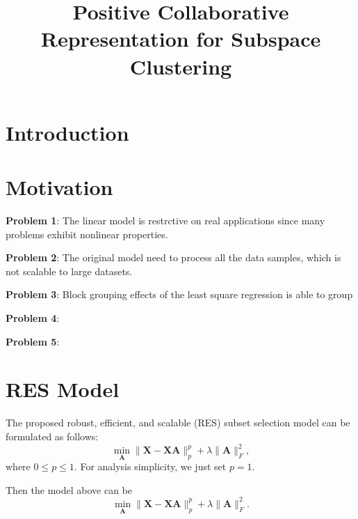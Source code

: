 \documentclass[10pt,twocolumn,letterpaper]{article}
\begin{document}
\title{Positive Collaborative Representation for Subspace Clustering}

\maketitle



\begin{abstract}

\end{abstract}

\section{Introduction}



\section{Motivation}


\textbf{Problem 1}: The linear model is restrctive on real applications since many problems exhibit nonlinear properties.

\textbf{Problem 2}: The original model need to process all the data samples, which is not scalable to large datasets.

\textbf{Problem 3}: Block grouping effects of the least square regression is able to group 

\textbf{Problem 4}: 

\textbf{Problem 5}:


\section{RES Model}
The proposed robust, efficient, and scalable (RES) subset selection model can be formulated as follows:
\begin{equation}
\label{e1}
\min_{\bm{A}}
\|
\bm{X}
-
\bm{X}\bm{A}
\|_{p}^{p}
+
\lambda
\|
\bm{A}
\|_{F}^{2},
\end{equation}
where $0\le p\le1$. For analysis simplicity, we just set $p=1$.

Then the model above can be 
\begin{equation}
\label{e2}
\min_{\bm{A}}
\|
\bm{X}
-
\bm{X}\bm{A}
\|_{p}^{p}
+
\lambda
\|
\bm{A}
\|_{F}^{2}
.
\end{equation}
\end{document}
